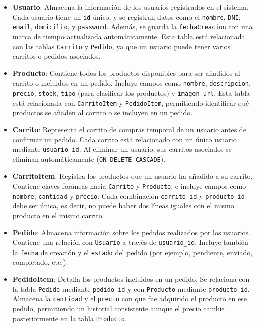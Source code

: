 \documentclass[10pt]{book}
\begin{document}
    \begin{itemize}
        \item \textbf{Usuario}: Almacena la información de los usuarios registrados en el sistema. Cada usuario tiene un \texttt{id} único, y se registran datos como el \texttt{nombre}, \texttt{DNI}, \texttt{email}, \texttt{domicilio}, y \texttt{password}. Además, se guarda la \texttt{fechaCreacion} con una marca de tiempo actualizada automáticamente. Esta tabla está relacionada con las tablas \texttt{Carrito} y \texttt{Pedido}, ya que un usuario puede tener varios carritos o pedidos asociados.
        
        \item \textbf{Producto}: Contiene todos los productos disponibles para ser añadidos al carrito o incluidos en un pedido. Incluye campos como \texttt{nombre}, \texttt{descripcion}, \texttt{precio}, \texttt{stock}, \texttt{tipo} (para clasificar los productos) y \texttt{imagen\_url}. Esta tabla está relacionada con \texttt{CarritoItem} y \texttt{PedidoItem}, permitiendo identificar qué productos se añaden al carrito o se incluyen en un pedido.
        
        \item \textbf{Carrito}: Representa el carrito de compras temporal de un usuario antes de confirmar un pedido. Cada carrito está relacionado con un único usuario mediante \texttt{usuario\_id}. Al eliminar un usuario, sus carritos asociados se eliminan automáticamente (\texttt{ON DELETE CASCADE}).
        
        \item \textbf{CarritoItem}: Registra los productos que un usuario ha añadido a su carrito. Contiene claves foráneas hacia \texttt{Carrito} y \texttt{Producto}, e incluye campos como \texttt{nombre}, \texttt{cantidad} y \texttt{precio}. Cada combinación \texttt{carrito\_id} y \texttt{producto\_id} debe ser única, es decir, no puede haber dos líneas iguales con el mismo producto en el mismo carrito.
        
        \item \textbf{Pedido}: Almacena información sobre los pedidos realizados por los usuarios. Contiene una relación con \texttt{Usuario} a través de \texttt{usuario\_id}. Incluye también la \texttt{fecha} de creación y el \texttt{estado} del pedido (por ejemplo, pendiente, enviado, completado, etc.).
        
        \item \textbf{PedidoItem}: Detalla los productos incluidos en un pedido. Se relaciona con la tabla \texttt{Pedido} mediante \texttt{pedido\_id} y con \texttt{Producto} mediante \texttt{producto\_id}. Almacena la \texttt{cantidad} y el \texttt{precio} con que fue adquirido el producto en ese pedido, permitiendo un historial consistente aunque el precio cambie posteriormente en la tabla \texttt{Producto}.
    \end{itemize}
    
\end{document}
